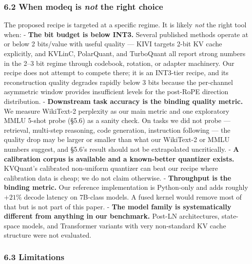 \documentclass[
]{article}
\begin{document}
\subsubsection{\texorpdfstring{6.2 When modeq is \emph{not} the right
choice}{6.2 When modeq is not the right choice}}\label{when-modeq-is-not-the-right-choice}

The proposed recipe is targeted at a specific regime. It is likely
\emph{not} the right tool when: - \textbf{The bit budget is below INT3.}
Several published methods operate at or below 2 bits/value with useful
quality --- KIVI targets 2-bit KV cache explicitly, and KVLinC,
PolarQuant, and TurboQuant all report strong numbers in the 2--3 bit
regime through codebook, rotation, or adapter machinery. Our recipe does
not attempt to compete there; it is an INT3-tier recipe, and its
reconstruction quality degrades rapidly below 3 bits because the
per-channel asymmetric window provides insufficient levels for the
post-RoPE direction distribution. - \textbf{Downstream task accuracy is
the binding quality metric.} We measure WikiText-2 perplexity as our
main metric and one exploratory MMLU 5-shot probe (§5.6) as a sanity
check. On tasks we did not probe --- retrieval, multi-step reasoning,
code generation, instruction following --- the quality drop may be
larger or smaller than what our WikiText-2 or MMLU numbers suggest, and
§5.6's result should not be extrapolated uncritically. - \textbf{A
calibration corpus is available and a known-better quantizer exists.}
KVQuant's calibrated non-uniform quantizer can beat our recipe where
calibration data is cheap; we do not claim otherwise. -
\textbf{Throughput is the binding metric.} Our reference implementation
is Python-only and adds roughly \(+21 \%\) decode latency on 7B-class
models. A fused kernel would remove most of that but is not part of this
paper. - \textbf{The model family is systematically different from
anything in our benchmark.} Post-LN architectures, state-space models,
and Transformer variants with very non-standard KV cache structure were
not evaluated.

\subsubsection{6.3 Limitations}\label{limitations}
\end{document}
